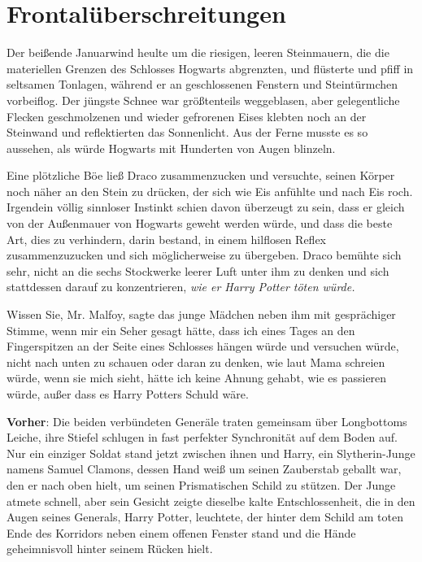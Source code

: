 \chapter{Frontalüberschreitungen}

Der beißende Januarwind heulte um die riesigen, leeren Steinmauern, die die
materiellen Grenzen des Schlosses Hogwarts abgrenzten, und flüsterte und pfiff
in seltsamen Tonlagen, während er an geschlossenen Fenstern und Steintürmchen
vorbeiflog. Der jüngste Schnee war größtenteils weggeblasen, aber gelegentliche
Flecken geschmolzenen und wieder gefrorenen Eises klebten noch an der Steinwand
und reflektierten das Sonnenlicht. Aus der Ferne musste es so aussehen, als
würde Hogwarts mit Hunderten von Augen blinzeln.

Eine plötzliche Böe ließ Draco zusammenzucken und versuchte, seinen Körper noch
näher an den Stein zu drücken, der sich wie Eis anfühlte und nach Eis roch.
Irgendein völlig sinnloser Instinkt schien davon überzeugt zu sein, dass er
gleich von der Außenmauer von Hogwarts geweht werden würde, und dass die beste
Art, dies zu verhindern, darin bestand, in einem hilflosen Reflex
zusammenzuzucken und sich möglicherweise zu übergeben. Draco bemühte sich sehr,
nicht an die sechs Stockwerke leerer Luft unter ihm zu denken und sich
stattdessen darauf zu konzentrieren, \emph{wie er Harry Potter töten würde.}

\glqq{}Wissen Sie, Mr. Malfoy\grqq{}, sagte das junge Mädchen neben ihm mit
gesprächiger Stimme, \glqq{}wenn mir ein Seher gesagt hätte, dass ich eines Tages
an den Fingerspitzen an der Seite eines Schlosses hängen würde und versuchen
würde, nicht nach unten zu schauen oder daran zu denken, wie laut Mama schreien
würde, wenn sie mich sieht, hätte ich keine Ahnung gehabt, wie es passieren
würde, außer dass es Harry Potters Schuld wäre.\grqq{}

\textbf{Vorher}: Die beiden verbündeten Generäle traten gemeinsam über
Longbottoms Leiche, ihre Stiefel schlugen in fast perfekter Synchronität auf dem
Boden auf. Nur ein einziger Soldat stand jetzt zwischen ihnen und Harry, ein
Slytherin-Junge namens Samuel Clamons, dessen Hand weiß um seinen Zauberstab
geballt war, den er nach oben hielt, um seinen Prismatischen Schild zu stützen.
Der Junge atmete schnell, aber sein Gesicht zeigte dieselbe kalte
Entschlossenheit, die in den Augen seines Generals, Harry Potter, leuchtete, der
hinter dem Schild am toten Ende des Korridors neben einem offenen Fenster stand
und die Hände geheimnisvoll hinter seinem Rücken hielt.

